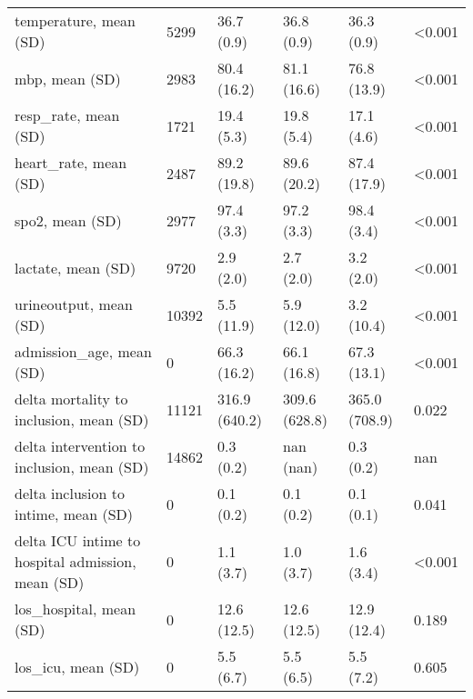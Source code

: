 \begin{tabular}{llllll}
temperature, mean (SD)                            &    5299 &     36.7 (0.9) &        36.8 (0.9) &             36.3 (0.9) &  <0.001 \\
mbp, mean (SD)                                    &    2983 &    80.4 (16.2) &       81.1 (16.6) &            76.8 (13.9) &  <0.001 \\
resp\_rate, mean (SD)                              &    1721 &     19.4 (5.3) &        19.8 (5.4) &             17.1 (4.6) &  <0.001 \\
heart\_rate, mean (SD)                             &    2487 &    89.2 (19.8) &       89.6 (20.2) &            87.4 (17.9) &  <0.001 \\
spo2, mean (SD)                                   &    2977 &     97.4 (3.3) &        97.2 (3.3) &             98.4 (3.4) &  <0.001 \\
lactate, mean (SD)                                &    9720 &      2.9 (2.0) &         2.7 (2.0) &              3.2 (2.0) &  <0.001 \\
urineoutput, mean (SD)                            &   10392 &     5.5 (11.9) &        5.9 (12.0) &             3.2 (10.4) &  <0.001 \\
admission\_age, mean (SD)                          &       0 &    66.3 (16.2) &       66.1 (16.8) &            67.3 (13.1) &  <0.001 \\
delta mortality to inclusion, mean (SD)           &   11121 &  316.9 (640.2) &     309.6 (628.8) &          365.0 (708.9) &   0.022 \\
delta intervention to inclusion, mean (SD)        &   14862 &      0.3 (0.2) &         nan (nan) &              0.3 (0.2) &     nan \\
delta inclusion to intime, mean (SD)              &       0 &      0.1 (0.2) &         0.1 (0.2) &              0.1 (0.1) &   0.041 \\
delta ICU intime to hospital admission, mean (SD) &       0 &      1.1 (3.7) &         1.0 (3.7) &              1.6 (3.4) &  <0.001 \\
los\_hospital, mean (SD)                           &       0 &    12.6 (12.5) &       12.6 (12.5) &            12.9 (12.4) &   0.189 \\
los\_icu, mean (SD)                                &       0 &      5.5 (6.7) &         5.5 (6.5) &              5.5 (7.2) &   0.605 \\
\bottomrule
\end{tabular}

